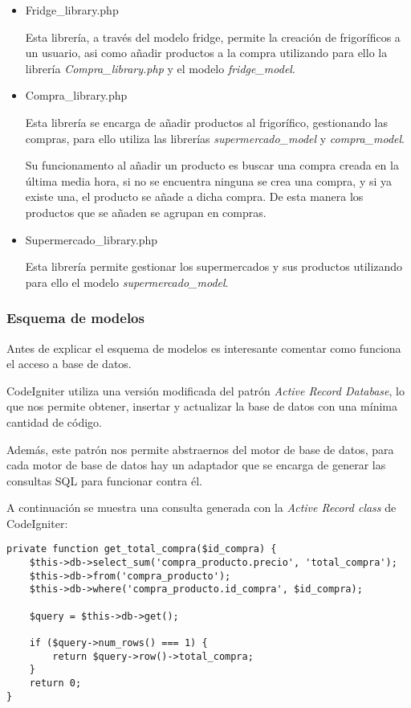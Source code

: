 \begin{itemize}
        \item Fridge\_library.php

            Esta librería, a través del modelo fridge, permite la creación de frigoríficos a un usuario, asi como añadir productos a la compra utilizando para ello la librería \emph{Compra\_library.php} y el modelo \emph{fridge\_model}.

        \item Compra\_library.php

            Esta librería se encarga de añadir productos al frigorífico, gestionando las compras, para ello utiliza las librerías \emph{supermercado\_model} y \emph{compra\_model}.

            Su funcionamento al añadir un producto es buscar una compra creada en la última media hora, si no se encuentra ninguna se crea una compra, y si ya existe una, el producto se añade a dicha compra. De esta manera los productos que se añaden se agrupan en compras.

        \item Supermercado\_library.php

            Esta librería permite gestionar los supermercados y sus productos utilizando para ello el modelo \emph{supermercado\_model}.
    \end{itemize}

    \subsubsection{Esquema de modelos}

        Antes de explicar el esquema de modelos es interesante comentar como funciona el acceso a base de datos.

        CodeIgniter utiliza una versión modificada del patrón \emph{Active Record Database}, lo que nos permite obtener, insertar y actualizar la base de datos con una mínima cantidad de código.

        Además, este patrón nos permite abstraernos del motor de base de datos, para cada motor de base de datos hay un adaptador que se encarga de generar las consultas SQL para funcionar contra él.

        A continuación se muestra una consulta generada con la \emph{Active Record class} de CodeIgniter:

        \begin{lstlisting}
private function get_total_compra($id_compra) {
    $this->db->select_sum('compra_producto.precio', 'total_compra');
    $this->db->from('compra_producto');
    $this->db->where('compra_producto.id_compra', $id_compra);

    $query = $this->db->get();

    if ($query->num_rows() === 1) {
        return $query->row()->total_compra;
    }
    return 0;
}
        \end{lstlisting}

